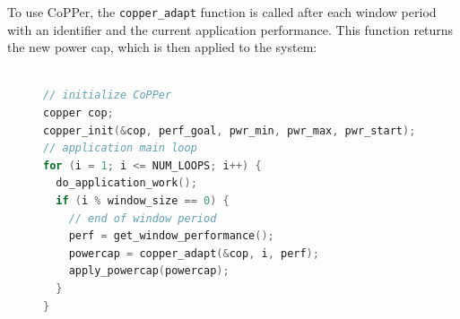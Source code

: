 \documentclass[a0,portrait]{a0poster}
\renewcommand{\small}{\fontsize{24.88}{30}\selectfont}
\newcommand{\SYSTEM}{CoPPer}
\newcommand{\app}[1]{\mbox{\texttt{#1}}}
\newcommand{\function}[1]{\mbox{\texttt{#1}}}
\begin{document}
\begin{multicols}{2}
To use \SYSTEM{}, the \function{copper\_adapt} function is called after each window period with an identifier and the current application performance.
This function returns the new power cap, which is then applied to the system:

\begin{figure}[H]
\small
\begin{minipage}[t]{.95\columnwidth}
%
\begin{lstlisting}[language=C,%
  caption={Using \SYSTEM{} to compute and apply power caps.},%
  morekeywords={uint64_t, uint32_t, hbsc_ctx, raplcap, raplcap_limit, copper},%
  label={lst:example-copper}]%

// initialize CoPPer
copper cop;
copper_init(&cop, perf_goal, pwr_min, pwr_max, pwr_start);
// application main loop
for (i = 1; i <= NUM_LOOPS; i++) {
  do_application_work();
  if (i % window_size == 0) {
    // end of window period
    perf = get_window_performance();
    powercap = copper_adapt(&cop, i, perf);
    apply_powercap(powercap);
  }
}
\end{lstlisting}
\end{minipage}
\end{figure}






\end{multicols}
\end{document}
